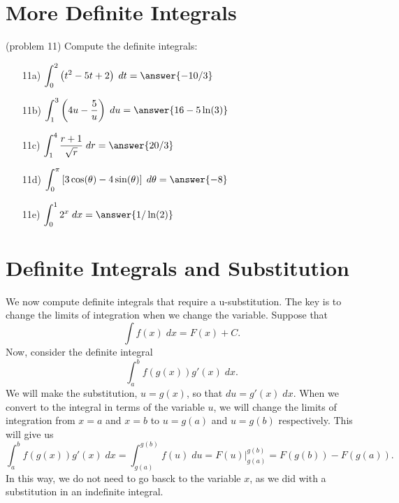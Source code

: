 \documentclass{ximera}
\begin{document}
\begin{center}
\begin{foldable}
\end{foldable}
\end{center}

\section{More Definite Integrals}


\begin{problem}(problem 11) Compute the definite integrals:
\begin{itemize}
\item[11a)] \; $\displaystyle{\int_0^2 \left(t^2 - 5t + 2\right) \; dt = \answer{-10/3}}$
\item[11b)] \; $\displaystyle{\int_1^ 3 \left(4u - \frac{5}{u}\right) \; du = \answer{16 - 5\ln(3)}}$
\item[11c)] \; $\displaystyle{\int_1^4 \frac{r + 1}{\sqrt r} \; dr = \answer{20/3}}$
\item[11d)] \; $\displaystyle{\int_0^\pi \left[3\cos(\theta) - 4\sin(\theta)\right] \; d\theta = \answer{-8}}$
\item[11e)] \; $\displaystyle{\int_0^1 2^x \; dx = \answer{1/\ln(2)}}$
\end{itemize}
\end{problem}



\section{Definite Integrals and Substitution}
We now compute definite integrals that require a u-substitution. The key is to change the limits of integration when we change the variable.
Suppose that
\[
\int f(x) \; dx = F(x) + C.
\]
Now, consider the definite integral
\[
\int_a^b f(g(x)) g'(x) \; dx.
\]
We will make the substitution, $u = g(x)$, so that $du = g'(x) \; dx$.
When we convert to the integral in terms of the variable $u$, we will change the limits of integration from $x = a$ and $x = b$ 
to $u = g(a)$ and $u = g(b)$ respectively. This will give us
\[\int_a^b f(g(x)) g'(x) \; dx = \int_{g(a)}^{g(b)} f(u) \; du = F(u)\bigg|_{g(a)}^{g(b)} = F(g(b)) - F(g(a)).\]
In this way, we do not need to go basck to the variable $x$, as we did with a substitution in an indefinite integral.
\end{document}
